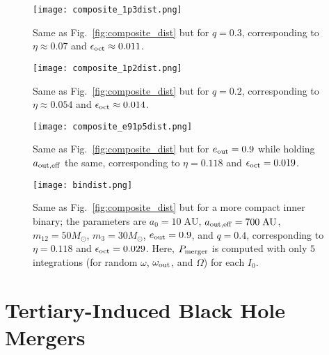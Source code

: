 \documentclass[
        fleqn,
        usenatbib,
    ]{mnras}
\begin{document}
\begin{figure}
    \centering
    \texttt{[image: composite\_1p3dist.png]}
    \caption{Same as Fig.~\ref{fig:composite_dist} but for $q = 0.3$,
    corresponding to $\eta \approx 0.07$ and $\epsilon_{\rm oct} \approx
    0.011$.}\label{fig:composite_1p3}
\end{figure}
\begin{figure}
    \centering
    \texttt{[image: composite\_1p2dist.png]}
    \caption{Same as Fig.~\ref{fig:composite_dist} but for $q = 0.2$,
    corresponding to $\eta \approx 0.054$ and $\epsilon_{\rm oct} \approx
    0.014$. }\label{fig:composite_1p2}
\end{figure}
\begin{figure}
    \centering
    \texttt{[image: composite\_e91p5dist.png]}
    \caption{Same as Fig.~\ref{fig:composite_dist} but for $e_{\rm out} = 0.9$
    while holding $a_{\rm out, eff}$ the same, corresponding to $\eta =
    0.118$ and $\epsilon_{\rm oct} = 0.019$. }\label{fig:composite_e91p5}
\end{figure}
\begin{figure}
    \centering
    \texttt{[image: bindist.png]}
    \caption{Same as Fig.~\ref{fig:composite_dist} but for a more compact inner
    binary; the parameters are $a_0 = 10\;\mathrm{AU}$, $a_{\rm out, eff} =
    700\;\mathrm{AU}$, $m_{12} = 50M_{\odot}$, $m_3 = 30M_{\odot}$, $e_{\rm
    out} = 0.9$, and $q = 0.4$, corresponding to $\eta = 0.118$ and
    $\epsilon_{\rm oct} = 0.029$. Here, $P_{\rm merger}$ is computed with
    only $5$ integrations (for random $\omega$, $\omega_{\rm out}$, and
    $\Omega$) for each $I_0$.}\label{fig:composite_bindist}
\end{figure}

\section{Tertiary-Induced Black Hole Mergers}\label{s:with_gw}
\end{document}
